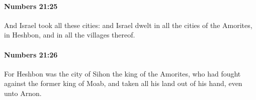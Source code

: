 		\paragraph{Numbers 21:25} %
			\label{NUMBERS-21-25}

			And Israel took all these cities: and Israel dwelt in all the cities of the Amorites, in Heshbon, and in all the villages thereof.


		\paragraph{Numbers 21:26} %
			\label{NUMBERS-21-26}

			For Heshbon was the city of Sihon the king of the Amorites, who had fought against the former king of Moab, and taken all his land out of his hand, even unto Arnon.


